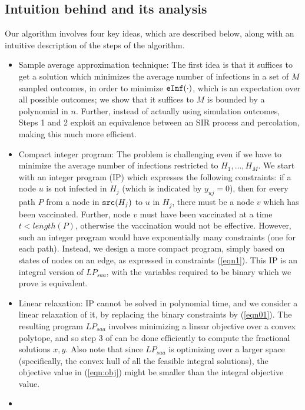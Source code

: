 \subsection{Intuition behind \algo{} and its analysis}

Our algorithm involves four key ideas, which are described below, along with an intuitive description of
the steps of the algorithm.
\begin{itemize}
\item
Sample average approximation technique: 
The first idea is that it suffices to get a solution which minimizes the average number of
infections in a set of $M$ sampled outcomes, in order to minimize $\texttt{eInf}(\cdot)$, which is an expectation
over all possible outcomes; we show that it suffices to $M$ is bounded by a polynomial in $n$.
Further, instead of actually using simulation outcomes, Steps 1 and 2 exploit an equivalence between an
SIR process and percolation, making this much more efficient.
\item
Compact integer program:
The problem is challenging even if we have to minimize the average number of infections restricted to
$H_1,\ldots,H_M$. We start with an integer program (IP) which expresses the following constraints: if a node $u$ is not infected in $H_j$
(which is indicated by $y_{uj}=0$), then for every path $P$ from a node in $\texttt{src}(H_j)$ to $u$ in $H_j$, there must be
a node $v$ which has been vaccinated. Further, node $v$ must have been vaccinated at a time $t< length(P)$, otherwise the
vaccination would not be effective. 
However, such an integer program would have exponentially many constraints (one for each path).
Instead, we design a more compact program,
simply based on states of nodes on an edge, as expressed in constraints (\ref{eqn1}).
This IP is an  integral version of $LP_{saa}$, with the variables required to be binary
which we prove is equivalent.
\item
Linear relaxation:
IP cannot be solved in polynomial time, and we consider a linear relaxation of it, by replacing the binary constraints
by (\ref{eqn01}). The resulting program $LP_{saa}$ involves minimizing a linear objective over a convex polytope,
and so step 3 of \algo{} can be done efficiently to compute the fractional solutions $x, y$.
Also note that since $LP_{saa}$ is optimizing over a larger space (specifically, the convex hull of all the
feasible integral solutions), the objective value in (\ref{eqn:obj}) might be smaller than the integral objective value.
\item

\end{itemize}
